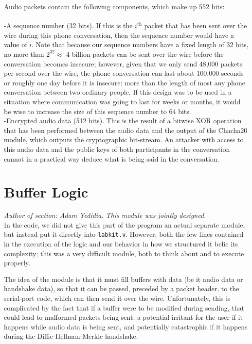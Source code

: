 \documentclass[a4paper]{report}
\begin{document}
Audio packets contain the following components, which make up 552 bits: \\ \\
-A sequence number (32 bits). If this is the $i^{\textrm{th}}$ packet that has been sent over the wire during this phone conversation, then the sequence number would have a value of $i$. Note that because our sequence numbers have a fixed length of 32 bits, no more than $2^{32} \approx $ 4 billion packets can be sent over the wire before the conversation becomes insecure; however, given that we only send 48,000 packets per second over the wire, the phone conversation can last about 100,000 seconds or roughly one day before it is insecure: more than the length of most any phone conversation between two ordinary people. If this design was to be used in a situation where communication was going to last for weeks or months, it would be wise to increase the size of this sequence number to 64 bits. \\
-Encrypted audio data (512 bits). This is the result of a bitwise XOR operation that has been performed between the audio data and the output of the Chacha20 module, which outputs the cryptographic bit-stream. An attacker with access to this audio data and the public keys of both participants in the conversation cannot in a practical way deduce what is being said in the conversation. \\

\section{Buffer Logic}

\emph{Author of section: Adam Yedidia. This module was jointly designed.} \\

In the code, we did not give this part of the program an actual separate module, but instead put it directly into \verb|labkit.v|. However, both the few lines contained in the execution of the logic and our behavior in how we structured it belie its complexity; this was a very difficult module, both to think about and to execute properly.

The idea of the module is that it must fill buffers with data (be it audio data or handshake data), so that it can be passed, preceded by a packet header, to the serial-port code, which can then send it over the wire. Unfortunately, this is complicated by the fact that if a buffer were to be modified during sending, that could lead to malformed packets being sent: a potential irritant for the user if it happens while audio data is being sent, and potentially catastrophic if it happens during the Diffie-Hellman-Merkle handshake.
\end{document}
